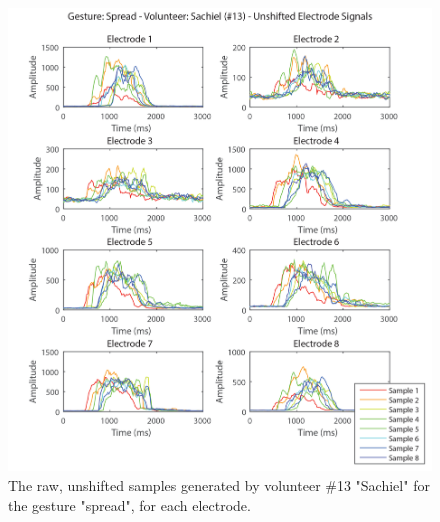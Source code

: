 \documentclass[journal]{IEEEtran}
\begin{document}
    
    \begin{figure}[p]
    \centering
    \includegraphics[width=1\columnwidth]{EMG/Spread_Max_Sachiel_Unshifted}
    \caption{The raw, unshifted samples generated by volunteer \#13 "Sachiel" for the gesture "spread", for each electrode.}
    \label{Spread_Max_Sachiel_Unshifted}
    \end{figure}
    
\end{document}
